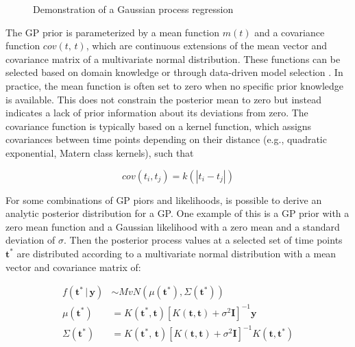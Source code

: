 \documentclass[man, floatsintext]{apa7}
\begin{document}
\begin{figure}[!t]
  \caption{Demonstration of a Gaussian process regression}
  \label{fig:gp_dem}
\end{figure}

The GP prior is parameterized by a mean function $m(t)$ and a covariance
function $cov(t, \, t)$, which are continuous extensions of the mean vector and
covariance matrix of a multivariate normal distribution. These functions can be
selected based on domain knowledge or through data-driven model selection
\parencite{richardson_gaussian_2017, abdessalem_automatic_2017}. In practice,
the mean function is often set to zero when no specific prior knowledge is
available. This does not constrain the posterior mean to zero but instead
indicates a lack of prior information about its deviations from zero. The
covariance function is typically based on a kernel function, which assigns
covariances between time points depending on their distance (e.g.,
quadratic exponential, Matern class kernels), such that

\begin{equation}
  cov(t_i, t_j) = k(|t_i - t_j|)
\end{equation}

For some combinations of GP piors and likelihoods, is possible to derive an
analytic posterior distribution for a GP\@. One example of this is a GP prior
with a zero mean function and a Gaussian likelihood with a zero mean and a
standard deviation of $\sigma$. Then the posterior process values at a selected
set of time points $\textbf{t}^*$ are distributed according to a multivariate
normal distribution with a mean vector and covariance matrix of:

\begin{equation}
  \begin{aligned}
    f(\textbf{t}^* \, | \, \textbf{y}) & \sim MvN(\mu(\textbf{t}^*),
    \Sigma(\textbf{t}^*))
    \\
    \mu(\textbf{t}^*)                  & = K(\textbf{t}^*,
    \textbf{t}){[K(\textbf{t},
            \textbf{t}) + \sigma^2
            \textbf{I}]}^{-1}\textbf{y}
    \\
    \Sigma(\textbf{t}^*)               & =K(\textbf{t}^*, \,
    \textbf{t}){[K(\textbf{t},
            \textbf{t}) + \sigma^2
            \textbf{I}]}^{-1} K(\textbf{t}, \textbf{t}^*)
  \end{aligned}
\end{equation}
\end{document}
